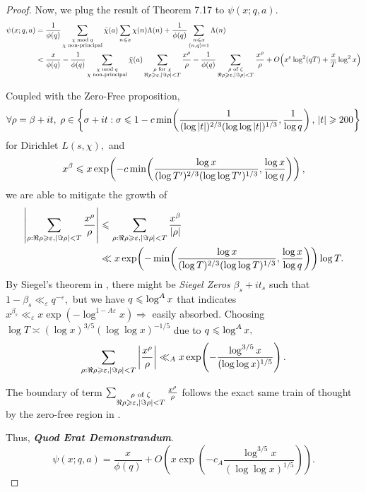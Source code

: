 \begin{proof}
Now, we plug the result of Theorem 7.17 to $\psi(x; q, a).$
\begin{align*}
    \psi(x; q, a) &= \frac{1}{\phi(q)} \sum_{\substack{\chi \bmod q \\ \chi \text{ non-principal}}} \bar{\chi}(a) \sum_{n \leqslant x} \chi(n) \Lambda(n) + \frac{1}{\phi(q)} \sum_{\substack{n \leqslant x \\ (n, q) = 1}} \Lambda(n) \\
    &< \frac{x}{\phi(q)} - \frac{1}{\phi(q)} \sum_{\substack{\chi \bmod q \\ \chi \text{ non-principal}}} \bar{\chi}(a) \sum_{\substack{\rho \text{ for } \chi \\ \Re \rho \geqslant \varepsilon, \left\lvert \Im \rho \right\rvert < T}} \frac{x^\rho}{\rho} - \frac{1}{\phi(q)}\sum_{\substack{\rho \text{ of } \zeta \\ \Re \rho \geqslant \varepsilon, \left\lvert \Im \rho \right\rvert < T}} \frac{x^\rho}{\rho} + O\!\left( x^\varepsilon \log^2(qT) + \frac{x}{T} \log^2 x \right)
\end{align*}

Coupled with the Zero-Free proposition, $$\forall \rho = \beta + it, \; \rho \in \left\{ \sigma + it : \sigma \leqslant 1 - c \min\!\left( \frac{1}{(\log |t|)^{2/3} (\log\log |t|)^{1/3}}, \frac{1}{\log q} \right), \, |t| \geqslant 200 \right\}$$ for Dirichlet $L(s, \chi),$ and $$x^\beta \leqslant x \exp\! \left( -c\min\!\left( \frac{\log x}{(\log T')^{2/3} (\log \log T')^{1/3}}, \frac{\log x}{\log q} \right) \right),$$ we are able to mitigate the growth of 
\begin{align*}
    \left\lvert \sum_{\rho: \Re \rho \geqslant \varepsilon, \left\lvert \Im \rho \right\rvert < T} \frac{x^\rho}{\rho} \right\rvert &\leqslant \sum_{\rho: \Re \rho \geqslant \varepsilon, \left\lvert \Im \rho \right\rvert < T} \frac{x^\beta}{\left\lvert \rho \right\rvert} \\ 
    &\ll x \exp\! \left( -\min\!\left( \frac{\log x}{(\log T)^{2/3} (\log \log T)^{1/3}}, \frac{\log x}{\log q} \right) \right) \log T.
\end{align*}
By Siegel's theorem in \cite[Ch.~21]{Davenport}, there might be \emph{Siegel Zeros} $\beta_s + it_s$ such that $1-\beta_s \ll_\varepsilon q^{-\varepsilon},$ but we have $q \leqslant \log^A x$ that indicates $x^{\beta_s} \ll_\varepsilon x\exp(-\log^{1-A\varepsilon} x) \Rightarrow$ easily absorbed. Choosing $\log T \asymp (\log x)^{3/5}(\log\log x)^{-1/5}$ due to $q \leqslant \log^A x,$ $$\sum_{\rho: \Re \rho \geqslant \varepsilon, \left\lvert \Im \rho \right\rvert < T} \left\lvert \frac{x^\rho}{\rho} \right\rvert \ll_A x \exp\! \left( - \frac{\log^{3/5}x}{(\log\log x)^{1/5}} \right).$$ 

The boundary of term $\sum_{\substack{\rho \text{ of } \zeta \\ \Re \rho \geqslant \varepsilon, \left\lvert \Im \rho \right\rvert < T}} \frac{x^\rho}{\rho}$ follows the exact same train of thought by the zero-free region in \cite[Ch.~13]{Davenport}.

Thus, \textbf{\textit{Quod Erat Demonstrandum}}. 
\begin{equation}
    \psi(x; q, a) = \frac{x}{\phi(q)} + O\!\left( x \exp\!\left( -c_A \frac{\log^{3/5} x}{(\log\log x)^{1/5}} \right) \right).
\end{equation}
\end{proof}
